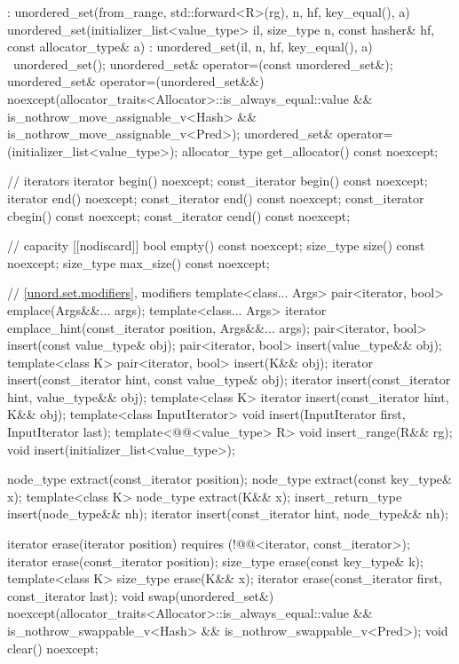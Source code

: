 \begin{codeblock}
{{        : unordered_set(from_range, std::forward<R>(rg), n, hf, key_equal(), a) { }
    unordered_set(initializer_list<value_type> il, size_type n, const hasher& hf,
                  const allocator_type& a)
      : unordered_set(il, n, hf, key_equal(), a) { }
    ~unordered_set();
    unordered_set& operator=(const unordered_set&);
    unordered_set& operator=(unordered_set&&)
      noexcept(allocator_traits<Allocator>::is_always_equal::value &&
               is_nothrow_move_assignable_v<Hash> &&
               is_nothrow_move_assignable_v<Pred>);
    unordered_set& operator=(initializer_list<value_type>);
    allocator_type get_allocator() const noexcept;

    // iterators
    iterator       begin() noexcept;
    const_iterator begin() const noexcept;
    iterator       end() noexcept;
    const_iterator end() const noexcept;
    const_iterator cbegin() const noexcept;
    const_iterator cend() const noexcept;

    // capacity
    [[nodiscard]] bool empty() const noexcept;
    size_type size() const noexcept;
    size_type max_size() const noexcept;

    // \ref{unord.set.modifiers}, modifiers
    template<class... Args> pair<iterator, bool> emplace(Args&&... args);
    template<class... Args> iterator emplace_hint(const_iterator position, Args&&... args);
    pair<iterator, bool> insert(const value_type& obj);
    pair<iterator, bool> insert(value_type&& obj);
    template<class K> pair<iterator, bool> insert(K&& obj);
    iterator insert(const_iterator hint, const value_type& obj);
    iterator insert(const_iterator hint, value_type&& obj);
    template<class K> iterator insert(const_iterator hint, K&& obj);
    template<class InputIterator> void insert(InputIterator first, InputIterator last);
    template<@@<value_type> R>
      void insert_range(R&& rg);
    void insert(initializer_list<value_type>);

    node_type extract(const_iterator position);
    node_type extract(const key_type& x);
    template<class K> node_type extract(K&& x);
    insert_return_type insert(node_type&& nh);
    iterator           insert(const_iterator hint, node_type&& nh);

    iterator  erase(iterator position)
      requires (!@@<iterator, const_iterator>);
    iterator  erase(const_iterator position);
    size_type erase(const key_type& k);
    template<class K> size_type erase(K&& x);
    iterator  erase(const_iterator first, const_iterator last);
    void      swap(unordered_set&)
      noexcept(allocator_traits<Allocator>::is_always_equal::value &&
               is_nothrow_swappable_v<Hash> &&
               is_nothrow_swappable_v<Pred>);
    void      clear() noexcept;

}}
\end{codeblock}
